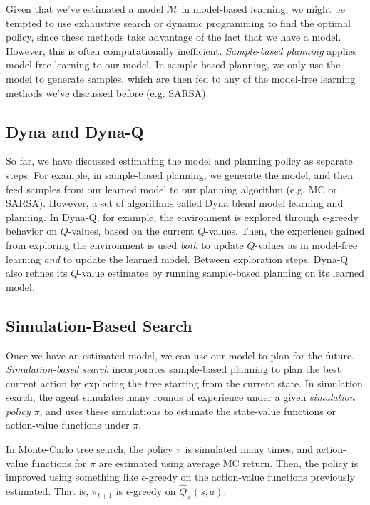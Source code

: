 \documentclass{article}
\newcommand{\ita}{\textit}
\newcommand{\eps}{\epsilon}
\begin{document}
Given that we've estimated a model $\mathcal{M}$ in model-based learning, we might be tempted to use exhaustive search or dynamic programming to find the optimal policy, since these methods take advantage of the fact that we have a model. However, this is often computationally inefficient. \ita{Sample-based planning} applies model-free learning to our model. In sample-based planning, we only use the model to generate samples, which are then fed to any of the model-free learning methods we've discussed before (e.g. SARSA).

\subsection{Dyna and Dyna-Q}

So far, we have discussed estimating the model and planning policy as separate steps. For example, in sample-based planning, we generate the model, and then feed samples from our learned model to our planning algorithm (e.g. MC or SARSA). However, a set of algorithms called Dyna blend model learning and planning. In Dyna-Q, for example, the environment is explored through $\eps$-greedy behavior on $Q$-values, based on the current $Q$-values. Then, the experience gained from exploring the environment is used \ita{both} to update $Q$-values as in model-free learning \ita{and} to update the learned model. Between exploration steps, Dyna-Q also refines its $Q$-value estimates by running sample-based planning on its learned model.

\subsection{Simulation-Based Search}

Once we have an estimated model, we can use our model to plan for the future. \ita{Simulation-based search} incorporates sample-based planning to plan the best current action by exploring the tree starting from the current state. In simulation search, the agent simulates many rounds of experience under a given \ita{simulation policy} $\pi$, and uses these simulations to estimate the state-value functions or action-value functions under $\pi$.

In Monte-Carlo tree search, the policy $\pi$ is simulated many times, and action-value functions for $\pi$ are estimated using average MC return. Then, the policy is improved using something like $\eps$-greedy on the action-value functions previously estimated. That is, $\pi_{t+1}$ is $\eps$-greedy on $\hat{Q}_\pi(s, a)$.
\end{document}
